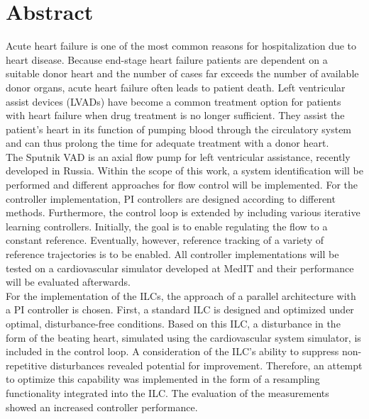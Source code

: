 \chapter{Abstract}

Acute heart failure is one of the most common reasons for hospitalization due to heart disease. Because end-stage heart failure patients are dependent on a suitable donor heart and the number of cases far exceeds the number of available donor organs, acute heart failure often leads to patient death. Left ventricular assist devices (LVADs) have become a common treatment option for patients with heart failure when drug treatment is no longer sufficient. They assist the patient's heart in its function of pumping blood through the circulatory system and can thus prolong the time for adequate treatment with a donor heart.
\\
The Sputnik VAD is an axial flow pump for left ventricular assistance, recently developed in Russia. Within the scope of this work, a system identification will be performed and different approaches for flow control will be implemented. For the controller implementation, PI controllers are designed according to different methods. Furthermore, the control loop is extended by including various iterative learning controllers. Initially, the goal is to enable regulating the flow to a constant reference. Eventually, however, reference tracking of a variety of reference trajectories is to be enabled. All controller implementations will be tested on a cardiovascular simulator developed at MedIT and their performance will be evaluated afterwards.
\\
For the implementation of the ILCs, the approach of a parallel architecture with a PI controller is chosen.
First, a standard ILC is designed and optimized under optimal, disturbance-free conditions. Based on this ILC, a disturbance in the form of the beating heart, simulated using the cardiovascular system simulator, is included in the control loop. A consideration of the ILC's ability to suppress non-repetitive disturbances revealed potential for improvement. Therefore, an attempt to optimize this capability was implemented in the form of a resampling functionality integrated into the ILC. The evaluation of the measurements showed an increased controller performance.


\cleardoubleemptypage
\thispagestyle{empty}

